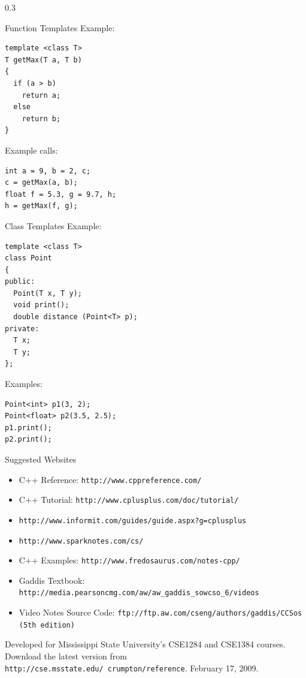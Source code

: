 \documentclass[final]{beamer}
\begin{document}
\begin{frame}[t,fragile]
\begin{columns}[t,totalwidth=0.95\paperwidth, colsep=0.05\paperwidth]
\begin{column}{0.3\paperwidth}
\begin{block}{Function Templates}
Example:
\begin{lstlisting}
template <class T>
T getMax(T a, T b)
{
  if (a > b)
    return a;
  else
    return b;
}
\end{lstlisting}
Example calls:
\begin{lstlisting}
int a = 9, b = 2, c;
c = getMax(a, b);
float f = 5.3, g = 9.7, h;
h = getMax(f, g);
\end{lstlisting}
\end{block}

\begin{block}{Class Templates}
Example:
\begin{lstlisting}
template <class T>
class Point
{
public:
  Point(T x, T y);
  void print();
  double distance (Point<T> p);
private:
  T x;
  T y;
};
\end{lstlisting}
Examples:
\begin{lstlisting}
Point<int> p1(3, 2);
Point<float> p2(3.5, 2.5);
p1.print();
p2.print();
\end{lstlisting}
\end{block}

\begin{block}{Suggested Websites}
\begin{itemize}
    \item C++ Reference: \texttt{http://www.cppreference.com/}
    \item C++ Tutorial: \texttt{http://www.cplusplus.com/doc/tutorial/}
    \item \texttt{http://www.informit.com/guides/guide.aspx?g=cplusplus}
    \item \texttt{http://www.sparknotes.com/cs/}
    \item C++ Examples: \texttt{http://www.fredosaurus.com/notes-cpp/}
    \item Gaddis Textbook: \texttt{http://media.pearsoncmg.com/aw/aw\_gaddis\_sowcso\_6/videos}
    \item Video Notes Source Code: \texttt{ftp://ftp.aw.com/cseng/authors/gaddis/CCSos (5th edition)}
\end{itemize}
Developed for Mississippi State University's CSE1284 and CSE1384 courses.
Download the latest version from \texttt{http://cse.msstate.edu/~crumpton/reference}.  
February 17, 2009.
\end{block}

\end{column}

\end{columns}
\end{frame}
\end{document}
